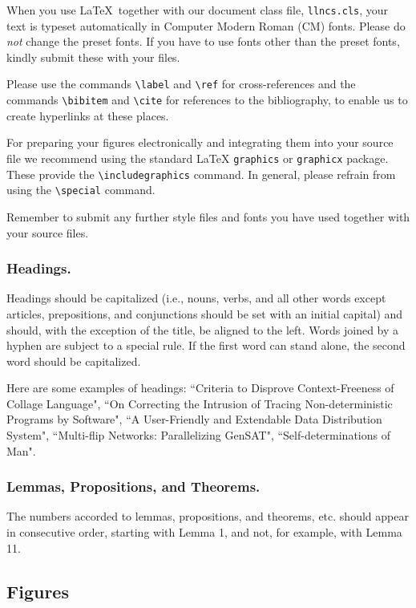 \documentclass[runningheads]{llncs}
\begin{document}
When you use \LaTeX\ together with our document class file,
\texttt{llncs.cls},
your text is typeset automatically in Computer Modern Roman (CM) fonts.
Please do
\emph{not} change the preset fonts. If you have to use fonts other
than the preset fonts, kindly submit these with your files.

Please use the commands \verb+\label+ and \verb+\ref+ for
cross-references and the commands \verb+\bibitem+ and \verb+\cite+ for
references to the bibliography, to enable us to create hyperlinks at
these places.

For preparing your figures electronically and integrating them into
your source file we recommend using the standard \LaTeX{} \verb+graphics+ or
\verb+graphicx+ package. These provide the \verb+\includegraphics+ command.
In general, please refrain from using the \verb+\special+ command.

Remember to submit any further style files and
fonts you have used together with your source files.

\subsubsection{Headings.}

Headings should be capitalized
(i.e., nouns, verbs, and all other words
except articles, prepositions, and conjunctions should be set with an
initial capital) and should,
with the exception of the title, be aligned to the left.
Words joined by a hyphen are subject to a special rule. If the first
word can stand alone, the second word should be capitalized.

Here are some examples of headings: ``Criteria to Disprove
Context-Freeness of Collage Language", ``On Correcting the Intrusion of
Tracing Non-deterministic Programs by Software", ``A User-Friendly and
Extendable Data Distribution System", ``Multi-flip Networks:
Parallelizing GenSAT", ``Self-determinations of Man".

\subsubsection{Lemmas, Propositions, and Theorems.}

The numbers accorded to lemmas, propositions, and theorems, etc. should
appear in consecutive order, starting with Lemma 1, and not, for
example, with Lemma 11.

\subsection{Figures}
\end{document}
